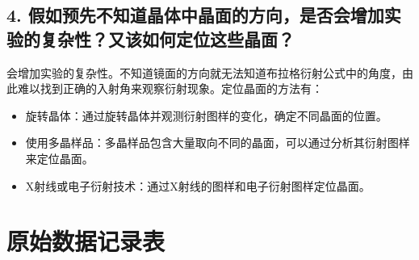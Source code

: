 \documentclass[zihao=5, UTF8]{article}
\theoremstyle{MyLineTheoremStyle} %
\theoremstyle{MyBlockTheoremStyle} %
\theoremstyle{MySubsubsectionStyle} %
\begin{document}
\subsection*{4. 假如预先不知道晶体中晶面的方向，是否会增加实验的复杂性？又该如何定位这些晶面？}
会增加实验的复杂性。不知道镜面的方向就无法知道布拉格衍射公式中的角度，由此难以找到正确的入射角来观察衍射现象。定位晶面的方法有：
\begin{itemize}
    \item 旋转晶体：通过旋转晶体并观测衍射图样的变化，确定不同晶面的位置。
    \item 使用多晶样品：多晶样品包含大量取向不同的晶面，可以通过分析其衍射图样来定位晶面。
    \item X射线或电子衍射技术：通过X射线的图样和电子衍射图样定位晶面。
\end{itemize}

\section{原始数据记录表}

\end{document}
